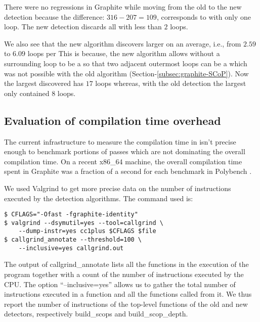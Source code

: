 \documentclass{sig-alternate}
\begin{document}
There were no regressions in Graphite while moving from the old to the new \SCoP{}
detection because the difference: $316 - 207 = 109$, corresponds
to  with only one loop.  The new \SCoP{}
detection discards all  with less than $2$ loops.

We also see that the new algorithm discovers larger  on an average,
i.e., from $2.59$ to $6.09$ loops per  This is because, the new
algorithm allows \SESE{} without a surrounding loop to be a \SCoP{} so that two
adjacent outermost loops can be a \SCoP{,} which was not possible with the old algorithm
(Section-\ref{subsec:graphite-SCoP}). Now the largest \SCoP{} discovered has $17$
loops whereas, with the old \SCoP{} detection the largest \SCoP{} only contained $8$ loops.

\subsection{Evaluation of compilation time overhead}
The current infrastructure to measure the compilation time in \GCC{} isn't precise
enough to benchmark portions of passes which are not dominating the overall
compilation time.  On a recent x86\_64 machine, the overall compilation time
spent in Graphite was a fraction of a second for each benchmark
in Polybench \cite{polybench}.

We used Valgrind to get more precise data on the number of instructions executed
by the \SCoP{} detection algorithms.  The command used is:
\begin{verbatim}
$ CFLAGS="-Ofast -fgraphite-identity"
$ valgrind --dsymutil=yes --tool=callgrind \
    --dump-instr=yes cc1plus $CFLAGS $file
$ callgrind_annotate --threshold=100 \
    --inclusive=yes callgrind.out
\end{verbatim}

The output of callgrind\_annotate lists all the functions in the execution of
the program together with a count of the number of instructions executed by the
CPU.  The option ``--inclusive=yes'' allows us to gather the total number of
instructions executed in a function and all the functions called from it.  We
thus report the number of instructions of the top-level functions of the old and
new \SCoP{} detectors, respectively build\_scops and build\_scop\_depth.
\end{document}

